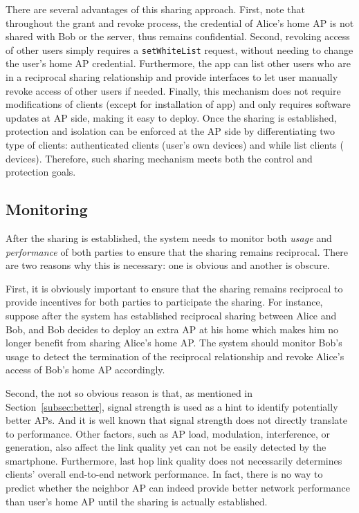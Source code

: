 There are several advantages of this sharing approach. First, note that
throughout the grant and revoke process, the \wifi{} credential of Alice's home
AP is not shared with Bob or the \wisefi{} server, thus remains confidential.
Second, revoking access of other \wisefi{} users simply requires a
\texttt{setWhiteList} request, without needing to change the user's home AP
\wifi{} credential. Furthermore, the \wisefi{} app can list other \wisefi{}
users who are in a reciprocal sharing relationship and provide interfaces to let
user manually revoke access of other users if needed. Finally, this mechanism
does not require modifications of \wifi{} clients (except for installation of
\wisefi{} app) and only requires software updates at AP side, making it easy to
deploy.  Once the sharing is established, protection and isolation can be
enforced at the AP side by differentiating two type of clients: authenticated
clients (user's own devices) and while list clients (\wisefi{} devices).
Therefore, such sharing mechanism meets both the control and protection goals.


\subsection{Monitoring}
\label{subsec:monitoring}

After the sharing is established, the system needs to monitor both \wifi{}
\textit{usage} and \textit{performance} of both parties to ensure that the
sharing remains reciprocal.  There are two reasons why this is necessary: one is
obvious and another is obscure.

First, it is obviously important to ensure that the sharing remains reciprocal
to provide incentives for both parties to participate the sharing.
For instance, suppose after the system has established reciprocal \wifi{} sharing
between Alice and Bob, and Bob decides to deploy an extra AP at his home which
makes him no longer benefit from sharing Alice's home AP. The system should
monitor Bob's \wifi{} usage to detect the termination of the reciprocal
relationship and revoke Alice's access of Bob's home AP accordingly.

Second, the not so obvious reason is that, as mentioned in
Section~\ref{subsec:better}, \wifi{} signal strength is used as a hint to
identify potentially better APs. And it is well known that signal strength does
not directly translate to \wifi{} performance. Other factors, such as AP load,
modulation, interference, or \wifi{} generation, also affect the link quality
yet can not be easily detected by the smartphone. Furthermore, last hop \wifi{}
link quality does not necessarily determines clients' overall end-to-end network
performance. In fact, there is no way to predict whether the neighbor AP can
indeed provide better network performance than user's home AP until the sharing is
actually established.

